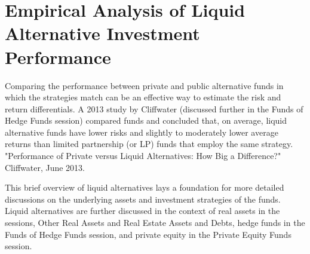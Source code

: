 \documentclass[11pt]{article}
\begin{document}
\section*{Empirical Analysis of Liquid Alternative Investment Performance}
Comparing the performance between private and public alternative funds in which the strategies match can be an effective way to estimate the risk and return differentials. A 2013 study by Cliffwater (discussed further in the Funds of Hedge Funds session) compared funds and concluded that, on average, liquid alternative funds have lower risks and slightly to moderately lower average returns than limited partnership (or LP) funds that employ the same strategy. "Performance of Private versus Liquid Alternatives: How Big a Difference?" Cliffwater, June 2013.

This brief overview of liquid alternatives lays a foundation for more detailed discussions on the underlying assets and investment strategies of the funds. Liquid alternatives are further discussed in the context of real assets in the sessions, Other Real Assets and Real Estate Assets and Debts, hedge funds in the Funds of Hedge Funds session, and private equity in the Private Equity Funds session.
\end{document}
